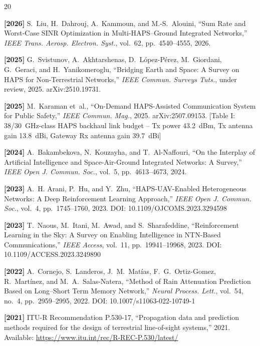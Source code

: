 \begin{thebibliography}{20}

\textbf{[2026]} S.~Liu, H.~Dahrouj, A.~Kammoun, and M.-S.~Alouini, ``Sum Rate and Worst-Case
SINR Optimization in Multi-HAPS--Ground Integrated Networks,'' \emph{IEEE
Trans. Aerosp. Electron. Syst.}, vol.~62, pp.~4540--4555, 2026.

\textbf{[2025]} G.~Svistunov, A.~Akhtarshenas, D.~L\'opez-P\'erez, M.~Giordani, G.~Geraci, and
H.~Yanikomeroglu, ``Bridging Earth and Space: A Survey on HAPS for
Non-Terrestrial Networks,'' \emph{IEEE Commun. Surveys Tuts.}, under review,
2025. arXiv:2510.19731.

\textbf{[2025]} M.~Karaman et~al., ``On-Demand HAPS-Assisted Communication System for Public
Safety,'' \emph{IEEE Commun. Mag.}, 2025. arXiv:2507.09153.
[Table I: 38/30~GHz-class HAPS backhaul link budget -- Tx power 43.2~dBm,
Tx antenna gain 13.8~dBi, Gateway Rx antenna gain 39.7~dBi]

\textbf{[2024]} A.~Bakambekova, N.~Kouzayha, and T.~Al-Naffouri, ``On the Interplay of Artificial
Intelligence and Space-Air-Ground Integrated Networks: A Survey,'' \emph{IEEE Open
J. Commun. Soc.}, vol.~5, pp.~4613--4673, 2024.

\textbf{[2023]} A.~H. Arani, P.~Hu, and Y.~Zhu, ``HAPS-UAV-Enabled Heterogeneous Networks: A Deep
Reinforcement Learning Approach,'' \emph{IEEE Open J. Commun. Soc.}, vol.~4,
pp.~1745--1760, 2023.
DOI: 10.1109/OJCOMS.2023.3294598

\textbf{[2023]} T.~Naous, M.~Itani, M.~Awad, and S.~Sharafeddine, ``Reinforcement Learning in
the Sky: A Survey on Enabling Intelligence in NTN-Based Communications,''
\emph{IEEE Access}, vol.~11, pp.~19941--19968, 2023.
DOI: 10.1109/ACCESS.2023.3249890

\textbf{[2022]} A.~Cornejo, S.~Landeros, J.~M.~Mat\'ias, F.~G.~Ortiz-Gomez, R.~Mart\'inez, and
M.~A.~Salas-Natera, ``Method of Rain Attenuation Prediction Based on
Long--Short Term Memory Network,'' \emph{Neural Process. Lett.}, vol.~54,
no.~4, pp.~2959--2995, 2022.
DOI: 10.1007/s11063-022-10749-1

\textbf{[2021]} ITU-R Recommendation P.530-17, ``Propagation data and prediction methods required
for the design of terrestrial line-of-sight systems,'' 2021.
Available: \url{https://www.itu.int/rec/R-REC-P.530/latest/}


\end{thebibliography}
